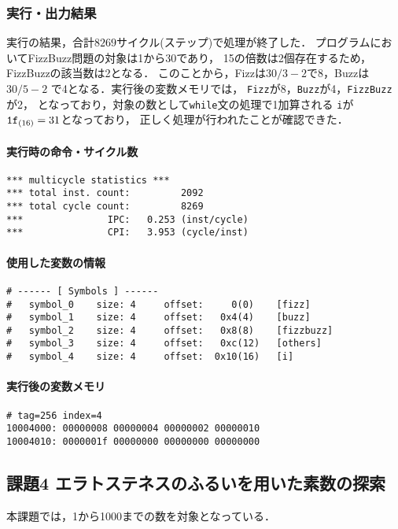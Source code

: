 \subsubsection{実行・出力結果}
実行の結果，合計$8269$サイクル(ステップ)で処理が終了した．
プログラムにおいてFizzBuzz問題の対象は1から30であり，
15の倍数は2個存在するため，FizzBuzzの該当数は2となる．
このことから，Fizzは$30 / 3 - 2$で8，Buzzは$30 / 5 - 2$
で4となる．実行後の変数メモリでは，
\verb|Fizz|が8，\verb|Buzz|が4，\verb|FizzBuzz|が2，
となっており，対象の数として\verb|while|文の処理で1加算される
\verb|i|が$\verb|1f|_{(16)} = 31$となっており，
正しく処理が行われたことが確認できた．

\paragraph*{実行時の命令・サイクル数}
\begin{Verbatim}[numbers=none, frame=single,
fontsize=\small, baselinestretch=0.8]
*** multicycle statistics ***
*** total inst. count:         2092
*** total cycle count:         8269
***               IPC:   0.253 (inst/cycle)
***               CPI:   3.953 (cycle/inst)
\end{Verbatim}

\paragraph*{使用した変数の情報}
\begin{Verbatim}[numbers=none, frame=single,
  fontsize=\small, baselinestretch=0.8]
# ------ [ Symbols ] ------
# 	symbol_0 	size: 4 	offset:     0(0) 	[fizz]
# 	symbol_1 	size: 4 	offset:   0x4(4) 	[buzz]
# 	symbol_2 	size: 4 	offset:   0x8(8) 	[fizzbuzz]
# 	symbol_3 	size: 4 	offset:   0xc(12) 	[others]
# 	symbol_4 	size: 4 	offset:  0x10(16) 	[i]  
\end{Verbatim}

\paragraph*{実行後の変数メモリ}
\begin{Verbatim}[numbers=none, frame=single,
  fontsize=\small, baselinestretch=0.8]
# tag=256 index=4
10004000: 00000008 00000004 00000002 00000010
10004010: 0000001f 00000000 00000000 00000000
\end{Verbatim}

\subsection{課題4 エラトステネスのふるいを用いた素数の探索}
本課題では，1から1000までの数を対象となっている．
